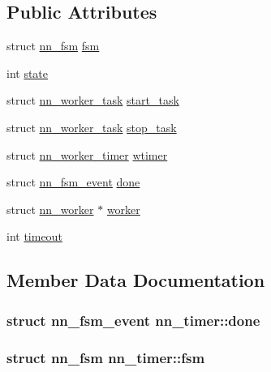 \subsection*{Public Attributes}
\begin{DoxyCompactItemize}
\item 
struct \hyperlink{structnn__fsm}{nn\+\_\+fsm} \hyperlink{structnn__timer_aee9372c284e1ed98d42ae2d638a3307b}{fsm}
\item 
int \hyperlink{structnn__timer_add4f847855d22e1fe8dc34761dd6cf9a}{state}
\item 
struct \hyperlink{structnn__worker__task}{nn\+\_\+worker\+\_\+task} \hyperlink{structnn__timer_ae8c14b7f156c28cf75eb0853ea5a3ff1}{start\+\_\+task}
\item 
struct \hyperlink{structnn__worker__task}{nn\+\_\+worker\+\_\+task} \hyperlink{structnn__timer_ae06667d9c88c1da44d67328354f75ae0}{stop\+\_\+task}
\item 
struct \hyperlink{structnn__worker__timer}{nn\+\_\+worker\+\_\+timer} \hyperlink{structnn__timer_abfb3e66a216d8c107add935b2b7aeb61}{wtimer}
\item 
struct \hyperlink{structnn__fsm__event}{nn\+\_\+fsm\+\_\+event} \hyperlink{structnn__timer_a96fed38db516133378a286bb38665b81}{done}
\item 
struct \hyperlink{structnn__worker}{nn\+\_\+worker} $\ast$ \hyperlink{structnn__timer_aefae7d82dbdbc7ed2e52b59be2f1977e}{worker}
\item 
int \hyperlink{structnn__timer_ae745dcc75be2f6878bb77b21223f1b02}{timeout}
\end{DoxyCompactItemize}


\subsection{Member Data Documentation}
\subsubsection[{done}]{\setlength{\rightskip}{0pt plus 5cm}struct {\bf nn\+\_\+fsm\+\_\+event} nn\+\_\+timer\+::done}\hypertarget{structnn__timer_a96fed38db516133378a286bb38665b81}{}\label{structnn__timer_a96fed38db516133378a286bb38665b81}
\subsubsection[{fsm}]{\setlength{\rightskip}{0pt plus 5cm}struct {\bf nn\+\_\+fsm} nn\+\_\+timer\+::fsm}\hypertarget{structnn__timer_aee9372c284e1ed98d42ae2d638a3307b}{}\label{structnn__timer_aee9372c284e1ed98d42ae2d638a3307b}
